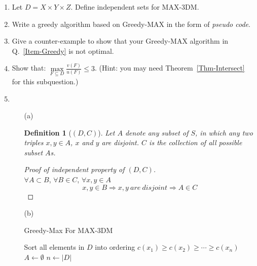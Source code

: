\documentclass[12pt,a4paper]{article}
\makeatletter
\newtheorem*{solution}{Solution}
\newtheorem{definition}{Definition}
\theoremstyle{definition}
\renewenvironment{solution}[1][Solution] {\par\pushQED{\qed}\normalfont\topsep6\p@\@plus6\p@\relax\trivlist\item[\hskip\labelsep\bfseries#1\@addpunct{.}]\ignorespaces}{\popQED\endtrivlist\@endpefalse} \makeatother
\makeatother
\begin{document}
\begin{enumerate}
    \begin{enumerate}
    	\item Let $D = X \times Y \times Z$. Define independent sets for MAX-3DM.
    	\item Write a greedy algorithm based on Greedy-MAX in the form of \emph{pseudo code}. \label{Item-Greedy}
    	\item Give a counter-example to show that your Greedy-MAX algorithm in Q.~\ref{Item-Greedy} is not optimal.
    	\item Show that: $\max\limits_{F \subseteq D} \frac{v(F)}{u(F)} \leq 3$. {\color{blue}(Hint: you may need Theorem~\ref{Thm-Intersect} for this subquestion.)} 
    	    \begin{solution}
    	    ~\\
    	    \begin{enumerate}
    	    \item[(a)]
    	    \begin{definition}[$(D,C)$]
    	    Let $A$ denote any subset of $S$, in which any two triples $x,y\in A$, $x$ and $y$ are disjoint. $C$ is the collection of all possible subset $A$s. 
    	    \end{definition}
    	    
    	   	\begin{proof}[Proof of independent property of $(D,C)$]
			~\\    	   	
    	   	$\forall A\subset B$, $\forall B\in C$, $\forall x,y \in A$
    	   	$$x,y \in B\Rightarrow x,y\ are \	disjoint\Rightarrow A\in C$$
    	   	
    	   	\end{proof}
    	    \item[(b)]
    	    ~\\
    	    \begin{algorithm}[H]
    	    
    	    \BlankLine
    	    
    	    \caption{Greedy-Max For MAX-3DM}\label{Alg-GreedyMax}
    	    
    	    Sort all elements in $D$ into ordering $c(x_1)\geq c(x_2)\geq \cdots \geq c(x_n)$\;
    	    $A\leftarrow \emptyset$\;
    	    $n\leftarrow |D|$\;
    	    \end{algorithm}
    	 

\end{enumerate}
\end{solution}
\end{enumerate}
\end{enumerate}
\end{document}
